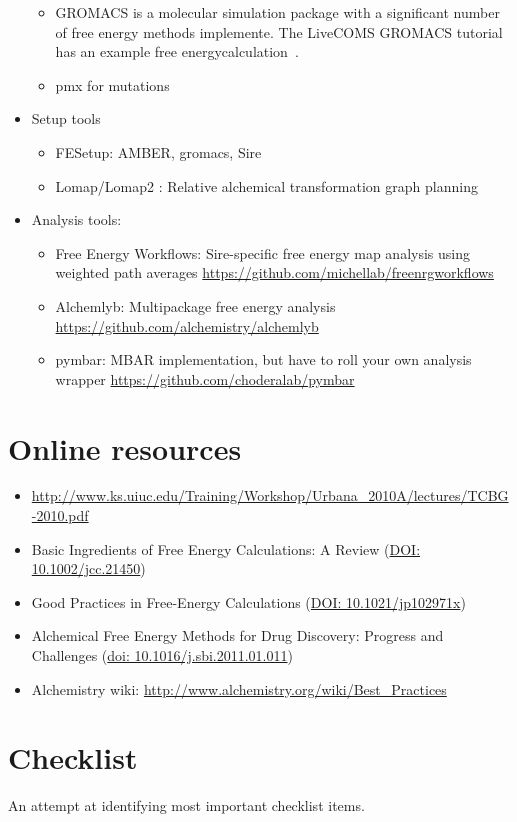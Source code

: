\documentclass[9pt,bestpractices]{livecoms}
\begin{document}
\begin{itemize}
\begin{itemize}
	\item GROMACS is a molecular simulation package with a significant number of free energy methods implemente. The LiveCOMS GROMACS tutorial has an example free energycalculation~\cite{LiveCOMS-gromacs}.
	\item pmx for mutations
	\end{itemize}
\item Setup tools
	\begin{itemize}
	\item FESetup: AMBER, gromacs, Sire
	\item Lomap/Lomap2 : Relative alchemical transformation graph planning
	\end{itemize}
\item Analysis tools:
	\begin{itemize}
	\item Free Energy Workflows: Sire-specific free energy map analysis using weighted path averages
	\url{https://github.com/michellab/freenrgworkflows}
	\item Alchemlyb: Multipackage free energy analysis
	\url{https://github.com/alchemistry/alchemlyb}
	\item pymbar: MBAR implementation, but have to roll your own analysis wrapper
	\url{https://github.com/choderalab/pymbar}
	\end{itemize}
\end{itemize}

\section{Online resources}
\begin{itemize}
\item \url{http://www.ks.uiuc.edu/Training/Workshop/Urbana_2010A/lectures/TCBG-2010.pdf}
\item Basic Ingredients of Free Energy Calculations: A Review (\url{DOI: 10.1002/jcc.21450})
\item Good Practices in Free-Energy Calculations (\url{DOI: 10.1021/jp102971x})
\item Alchemical Free Energy Methods for Drug Discovery: Progress and Challenges (\url{doi: 10.1016/j.sbi.2011.01.011})
\item Alchemistry wiki: \url{http://www.alchemistry.org/wiki/Best_Practices}
\end{itemize}

\section{Checklist}
\label{sec:checklist}
An attempt at identifying most important checklist items.
\end{document}
